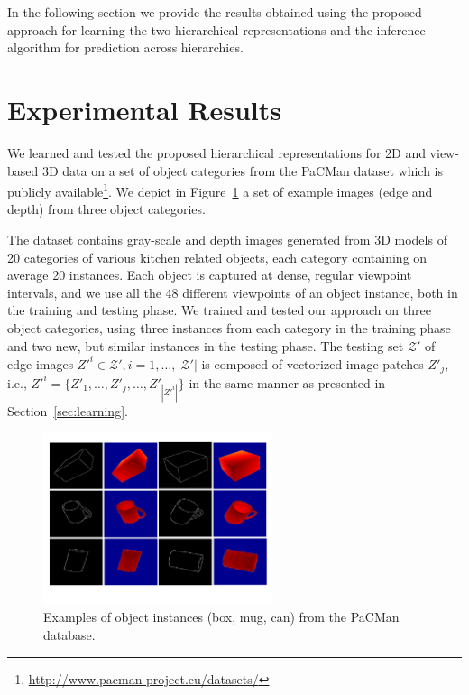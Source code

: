 \documentclass[runningheads]{llncs}
\begin{document}
In the following section we provide the results obtained using the proposed approach for learning the two hierarchical representations and the inference algorithm for prediction across hierarchies.

\section{Experimental Results}
\label{sec:results}

We learned and tested the proposed hierarchical representations for 2D and view-based 3D data on a set of object categories from the PaCMan dataset which is publicly available\footnote{\url{http://www.pacman-project.eu/datasets/}}. We depict in Figure~\ref{database} a set of example images (edge and depth) from three object categories. 

The dataset contains gray-scale and depth images generated from 3D models of 20 categories of various kitchen related objects, each category containing on average 20 instances. Each object is captured at dense, regular viewpoint intervals, and we use all the 48 different viewpoints of an object instance, both in the training and testing phase. We trained and tested our approach on three object categories, using three instances from each category in the training phase and two new, but similar instances in the testing phase. The testing set $\mathcal{Z'}$ of edge images $Z'^i \in \mathcal{Z'}, i=1,\ldots,|\mathcal{Z'}|$ is composed of vectorized image patches $Z'_j$, i.e., $Z'^i=\{Z'_1,\ldots,Z'_j,\ldots,Z'_{|Z'^i|}\}$ in the same manner as presented in Section~\ref{sec:learning}.

\begin{figure}
\begin{center}
\includegraphics[width=0.6\textwidth]{database}
\end{center}
\caption{Examples of object instances (box, mug, can) from the PaCMan database.}
\label{database}
\end{figure}
\end{document}
